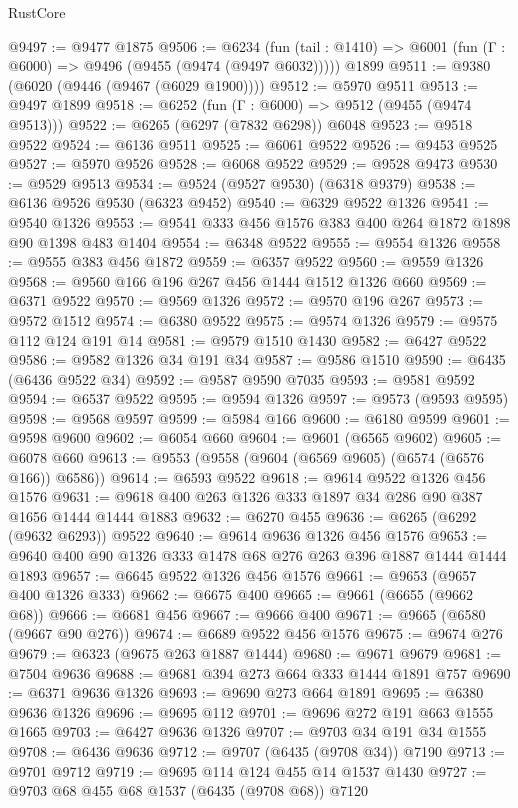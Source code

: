 \begin{lexlean}{RustCore}
\begin{coremodule}
{\begin{coremodule}
{{{{{{{{{{{{{{{{{{{{{{{{{{{{{{{{{{{{{{{{{{{{{@9497 := @9477 @1875
@9506 := @6234
    (fun (tail : @1410) => @6001 (fun (Γ : @6000) => @9496 (@9455 (@9474 (@9497 @6032)))))
    @1899
@9511 := @9380 (@6020 (@9446 (@9467 (@6029 @1900))))
@9512 := @5970 @9511
@9513 := @9497 @1899
@9518 := @6252 (fun (Γ : @6000) => @9512 (@9455 (@9474 @9513)))
@9522 := @6265 (@6297 (@7832 @6298)) @6048
@9523 := @9518 @9522
@9524 := @6136 @9511
@9525 := @6061 @9522
@9526 := @9453 @9525
@9527 := @5970 @9526
@9528 := @6068 @9522
@9529 := @9528 @9473
@9530 := @9529 @9513
@9534 := @9524 (@9527 @9530) (@6318 @9379)
@9538 := @6136 @9526 @9530 (@6323 @9452)
@9540 := @6329 @9522 @1326
@9541 := @9540 @1326
@9553 := @9541 @333 @456 @1576 @383 @400 @264 @1872 @1898 @90 @1398 @483 @1404
@9554 := @6348 @9522
@9555 := @9554 @1326
@9558 := @9555 @383 @456 @1872
@9559 := @6357 @9522
@9560 := @9559 @1326
@9568 := @9560 @166 @196 @267 @456 @1444 @1512 @1326 @660
@9569 := @6371 @9522
@9570 := @9569 @1326
@9572 := @9570 @196 @267
@9573 := @9572 @1512
@9574 := @6380 @9522
@9575 := @9574 @1326
@9579 := @9575 @112 @124 @191 @14
@9581 := @9579 @1510 @1430
@9582 := @6427 @9522
@9586 := @9582 @1326 @34 @191 @34
@9587 := @9586 @1510
@9590 := @6435 (@6436 @9522 @34)
@9592 := @9587 @9590 @7035
@9593 := @9581 @9592
@9594 := @6537 @9522
@9595 := @9594 @1326
@9597 := @9573 (@9593 @9595)
@9598 := @9568 @9597
@9599 := @5984 @166
@9600 := @6180 @9599
@9601 := @9598 @9600
@9602 := @6054 @660
@9604 := @9601 (@6565 @9602)
@9605 := @6078 @660
@9613 := @9553 (@9558 (@9604 (@6569 @9605) (@6574 (@6576 @166)) @6586))
@9614 := @6593 @9522
@9618 := @9614 @9522 @1326 @456 @1576
@9631 := @9618 @400 @263 @1326 @333 @1897 @34 @286 @90 @387 @1656 @1444 @1444 @1883
@9632 := @6270 @455
@9636 := @6265 (@6292 (@9632 @6293)) @9522
@9640 := @9614 @9636 @1326 @456 @1576
@9653 := @9640 @400 @90 @1326 @333 @1478 @68 @276 @263 @396 @1887 @1444 @1444 @1893
@9657 := @6645 @9522 @1326 @456 @1576
@9661 := @9653 (@9657 @400 @1326 @333)
@9662 := @6675 @400
@9665 := @9661 (@6655 (@9662 @68))
@9666 := @6681 @456
@9667 := @9666 @400
@9671 := @9665 (@6580 (@9667 @90 @276))
@9674 := @6689 @9522 @456 @1576
@9675 := @9674 @276
@9679 := @6323 (@9675 @263 @1887 @1444)
@9680 := @9671 @9679
@9681 := @7504 @9636
@9688 := @9681 @394 @273 @664 @333 @1444 @1891 @757
@9690 := @6371 @9636 @1326
@9693 := @9690 @273 @664 @1891
@9695 := @6380 @9636 @1326
@9696 := @9695 @112
@9701 := @9696 @272 @191 @663 @1555 @1665
@9703 := @6427 @9636 @1326
@9707 := @9703 @34 @191 @34 @1555
@9708 := @6436 @9636
@9712 := @9707 (@6435 (@9708 @34)) @7190
@9713 := @9701 @9712
@9719 := @9695 @114 @124 @455 @14 @1537 @1430
@9727 := @9703 @68 @455 @68 @1537 (@6435 (@9708 @68)) @7120
}}}}}}}}}}}}}}}}}}}}}}}}}}}}}}}}}}}}}}}}}}}}}
\end{coremodule}}
\end{coremodule}
\end{lexlean}
